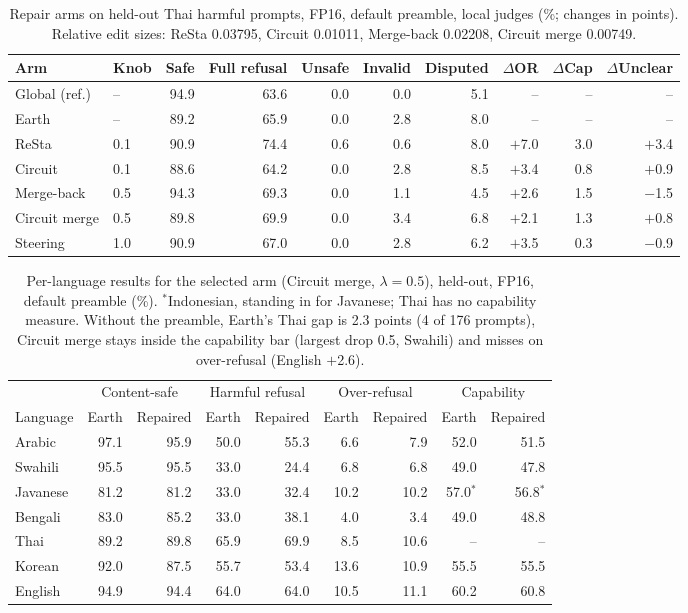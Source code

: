 \documentclass[11pt]{article}
\begin{document}
\begin{table}[t]
\centering\small
\setlength{\tabcolsep}{4pt}
\begin{tabular}{llrrrrrrrr}
\toprule
Arm & Knob & Safe & Full refusal & Unsafe & Invalid & Disputed & $\Delta$OR & $\Delta$Cap & $\Delta$Unclear \\
\midrule
Global (ref.) & -- & 94.9 & 63.6 & 0.0 & 0.0 & 5.1 & -- & -- & -- \\
Earth & -- & 89.2 & 65.9 & 0.0 & 2.8 & 8.0 & -- & -- & -- \\
ReSta & 0.1 & 90.9 & 74.4 & 0.6 & 0.6 & 8.0 & $+$7.0 & 3.0 & $+$3.4 \\
Circuit & 0.1 & 88.6 & 64.2 & 0.0 & 2.8 & 8.5 & $+$3.4 & 0.8 & $+$0.9 \\
Merge-back & 0.5 & 94.3 & 69.3 & 0.0 & 1.1 & 4.5 & $+$2.6 & 1.5 & $-$1.5 \\
Circuit merge & 0.5 & 89.8 & 69.9 & 0.0 & 3.4 & 6.8 & $+$2.1 & 1.3 & $+$0.8 \\
Steering & 1.0 & 90.9 & 67.0 & 0.0 & 2.8 & 6.2 & $+$3.5 & 0.3 & $-$0.9 \\
\bottomrule
\end{tabular}
\caption{Repair arms on held-out Thai harmful prompts, FP16, default preamble, local judges (\%; changes in
points). Relative edit sizes: ReSta 0.03795, Circuit 0.01011, Merge-back 0.02208, Circuit merge 0.00749.}
\label{tab:arms-full}
\end{table}

\begin{table}[t]
\centering\small
\begin{tabular}{lrrrrrrrr}
\toprule
& \multicolumn{2}{c}{Content-safe} & \multicolumn{2}{c}{Harmful refusal} & \multicolumn{2}{c}{Over-refusal} &
\multicolumn{2}{c}{Capability} \\
\cmidrule(lr){2-3}\cmidrule(lr){4-5}\cmidrule(lr){6-7}\cmidrule(lr){8-9}
Language & Earth & Repaired & Earth & Repaired & Earth & Repaired & Earth & Repaired \\
\midrule
Arabic & 97.1 & 95.9 & 50.0 & 55.3 & 6.6 & 7.9 & 52.0 & 51.5 \\
Swahili & 95.5 & 95.5 & 33.0 & 24.4 & 6.8 & 6.8 & 49.0 & 47.8 \\
Javanese & 81.2 & 81.2 & 33.0 & 32.4 & 10.2 & 10.2 & 57.0$^*$ & 56.8$^*$ \\
Bengali & 83.0 & 85.2 & 33.0 & 38.1 & 4.0 & 3.4 & 49.0 & 48.8 \\
Thai & 89.2 & 89.8 & 65.9 & 69.9 & 8.5 & 10.6 & -- & -- \\
Korean & 92.0 & 87.5 & 55.7 & 53.4 & 13.6 & 10.9 & 55.5 & 55.5 \\
English & 94.9 & 94.4 & 64.0 & 64.0 & 10.5 & 11.1 & 60.2 & 60.8 \\
\bottomrule
\end{tabular}
\caption{Per-language results for the selected arm (Circuit merge, $\lambda = 0.5$), held-out, FP16, default
preamble (\%). $^*$Indonesian, standing in for Javanese; Thai has no capability measure. Without the preamble,
Earth's Thai gap is 2.3 points (4 of 176 prompts), Circuit merge stays inside the capability bar (largest drop
0.5, Swahili) and misses on over-refusal (English $+$2.6).}
\label{tab:selected}
\end{table}
\end{document}
